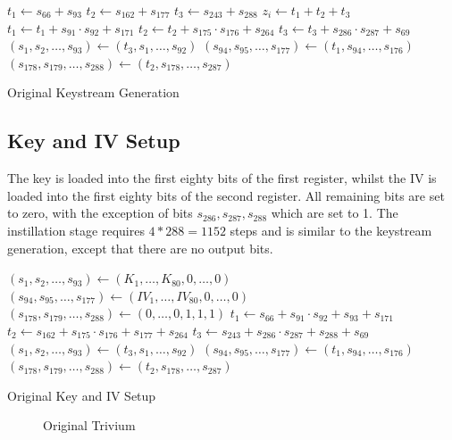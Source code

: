 \documentclass[conference]{IEEEtran}
\begin{document}
\begin{algorithm}[H]
\begin{algorithmic}[1]
 
\State $t_1 \gets s_{66} + s_{93}$
\State $t_2 \gets s_{162} + s_{177}$
\State $t_3 \gets s_{243} + s_{288}$
\State
\State $z_i \gets t_1 + t_2 + t_3$
\State
\State $t_1 \gets t_1 + s_{91} \cdot s_{92} + s_{171}$
\State $t_2 \gets t_2 + s_{175} \cdot s_{176} + s_{264}$
\State $t_3 \gets t_3 + s_{286} \cdot s_{287} + s_{69}$
\State
\State $(s_1,s_2,\dots,s_{93}) \gets (t_3,s_1,\dots,s_{92})$
\State $(s_{94},s_{95},\dots,s_{177}) \gets (t_1,s_{94},\dots,s_{176})$
\State $(s_{178},s_{179},\dots,s_{288}) \gets (t_2,s_{178},\dots,s_{287})$
\EndFor
\end{algorithmic}
\caption{Original Keystream Generation}
\end{algorithm}

\subsection{Key and IV Setup}\label{sec:key-iv-o}
The key is loaded into the first eighty bits of the first register, whilst the IV is loaded into the first eighty bits of the second register. All remaining bits are set to zero, with the exception of bits $s_{286},s_{287},s_{288}$ which are set to 1. The instillation stage requires $4*288=1152$ steps and is similar to the keystream generation, except that there are no output bits.

\begin{algorithm}[H]
\begin{algorithmic}[1]
\State $(s_1,s_2,\dots,s_{93}) \gets (K_1,\dots,K_{80},0,\dots,0)$
\State $(s_{94},s_{95},\dots,s_{177}) \gets (IV_1,\dots,IV_{80},0,\dots,0)$
\State $(s_{178},s_{179},\dots,s_{288}) \gets (0,\dots,0,1,1,1)$
\State
{}
\State $t_1 \gets s_{66} + s_{91} \cdot s_{92} + s_{93} + s_{171}$
\State $t_2 \gets s_{162} + s_{175} \cdot s_{176} + s_{177} + s_{264}$
\State $t_3 \gets s_{243} + s_{286} \cdot s_{287} + s_{288}+ s_{69}$
\State
\State $(s_1,s_2,\dots,s_{93}) \gets (t_3,s_1,\dots,s_{92})$
\State $(s_{94},s_{95},\dots,s_{177}) \gets (t_1,s_{94},\dots,s_{176})$
\State $(s_{178},s_{179},\dots,s_{288}) \gets (t_2,s_{178},\dots,s_{287})$
\EndFor
\end{algorithmic}
\caption{Original Key and IV Setup}
\end{algorithm}

\begin{figure}[H]
\centering

\caption{Original Trivium}
\label{fig:original}
\end{figure}
\end{document}
